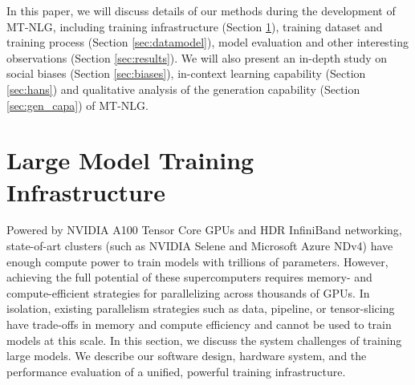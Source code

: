 \documentclass[11pt]{article}
\newcommand{\ours}{MT-NLG}
\begin{document}
In this paper, we will discuss details of our methods during the development of {\ours}, including training infrastructure (Section \ref{sec:train_infra}), training dataset and training process (Section \ref{sec:datamodel}), model evaluation and other interesting observations (Section \ref{sec:results}). We will also present an in-depth study on social biases (Section \ref{sec:biases}), in-context learning capability (Section \ref{sec:hans}) and qualitative analysis of the generation capability (Section \ref{sec:gen_capa}) of {\ours}. 





\section{Large Model Training Infrastructure}
\label{sec:train_infra}

Powered by NVIDIA A100 Tensor Core GPUs and HDR InfiniBand networking, state-of-art clusters (such as NVIDIA Selene and Microsoft Azure NDv4) have enough compute power to train models with trillions of parameters. However, achieving the full potential of these supercomputers requires memory- and compute-efficient strategies for parallelizing across thousands of GPUs. 
In isolation, existing parallelism strategies such as data, pipeline, or tensor-slicing have trade-offs in memory and compute efficiency and cannot be used to train models at this scale. In this section, we discuss the system challenges of training large models.  We describe our software design, hardware system, and the performance evaluation of a unified, powerful training infrastructure.  
\end{document}
